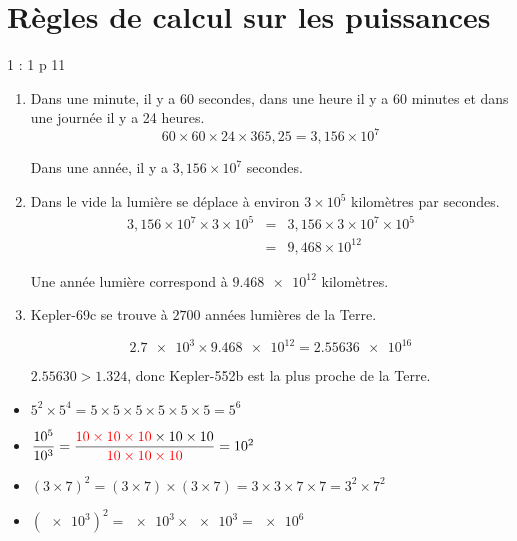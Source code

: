 \documentclass[12pt,a4paper]{article}
\date{}
\title{}
\begin{document}




\section{Règles de calcul sur les puissances}

\begin{myact}{1 : 1 p 11}
	 
	\begin{enumerate}[label=\alph*. ]
		\item Dans une minute, il y a 60 secondes, dans une heure il y a 60 minutes et dans une journée il y a 24 heures.
			\begin{equation*}
				60 \times 60 \times 24 \times 365,25 = 3,156 \times 10^7
			\end{equation*}
			
			Dans une année, il y a $3,156 \times 10^7$ secondes.
		
		\item Dans le vide la lumière se déplace à environ $3 \times 10^5$ kilomètres par secondes. 
			\begin{eqnarray*}
				3,156 \times 10^7 \times 3 \times 10^5 &=& 3,156 \times 3 \times 10^7 \times 10^5 \\
														&=& 9,468 \times 10^{12}
			\end{eqnarray*}
			
			Une année lumière correspond à $ \num{9.468 e12}$ kilomètres.
			
		\item Kepler-69c se trouve à $\num{2 700}$ années lumières de la Terre.
		
		\begin{equation*}
			\num{2.7 e3} \times \num{9.468 e12} = \num{2.55636 e16}
		\end{equation*}
		
		$\num{2.55630} > \num{1.324}$, donc Kepler-552b est la plus proche de la Terre.
	\end{enumerate}
		
		
\end{myact}

\begin{myex}
	\begin{itemize}
		\item $5^2 \times 5^4 = 5 \times 5 \times 5 \times 5 \times 5 \times 5 = 5^6$
		\item $\dfrac{\num{e5}}{\num{e3}} = \dfrac{\textcolor{red}{ 10 \times 10 \times 10} \times 10 \times 10}{\textcolor{red}{10 \times 10 \times 10}} = \num{e2}$
		\item $(3 \times 7)^2 = (3 \times 7) \times (3 \times 7) = 3 \times 3 \times 7 \times 7 = 3^2 \times 7^2$
		\item $(\num{e3})^2 = \num{e3} \times \num{e3} = \num{e6}$
	\end{itemize}
\end{myex}
	
\end{document}
